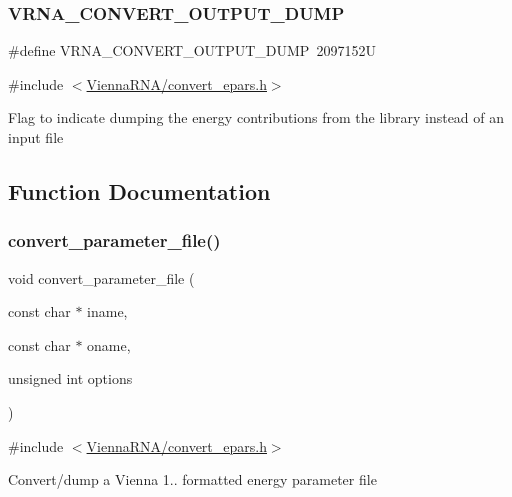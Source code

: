 \subsubsection{\texorpdfstring{V\+R\+N\+A\+\_\+\+C\+O\+N\+V\+E\+R\+T\+\_\+\+O\+U\+T\+P\+U\+T\+\_\+\+D\+U\+MP}{VRNA\_CONVERT\_OUTPUT\_DUMP}}
{\footnotesize\ttfamily \#define V\+R\+N\+A\+\_\+\+C\+O\+N\+V\+E\+R\+T\+\_\+\+O\+U\+T\+P\+U\+T\+\_\+\+D\+U\+MP~2097152U}



{\ttfamily \#include $<$\hyperlink{convert__epars_8h}{Vienna\+R\+N\+A/convert\+\_\+epars.\+h}$>$}

Flag to indicate dumping the energy contributions from the library instead of an input file 

\subsection{Function Documentation}
\mbox{\label{group__energy__parameters__convert_gafbe538bc4eb2cf2a33326e1010005f8a}} 
\subsubsection{\texorpdfstring{convert\+\_\+parameter\+\_\+file()}{convert\_parameter\_file()}}
{\footnotesize\ttfamily void convert\+\_\+parameter\+\_\+file (\begin{DoxyParamCaption}\item[{const char $\ast$}]{iname,  }\item[{const char $\ast$}]{oname,  }\item[{unsigned int}]{options }\end{DoxyParamCaption})}



{\ttfamily \#include $<$\hyperlink{convert__epars_8h}{Vienna\+R\+N\+A/convert\+\_\+epars.\+h}$>$}

Convert/dump a Vienna 1.. formatted energy parameter file

